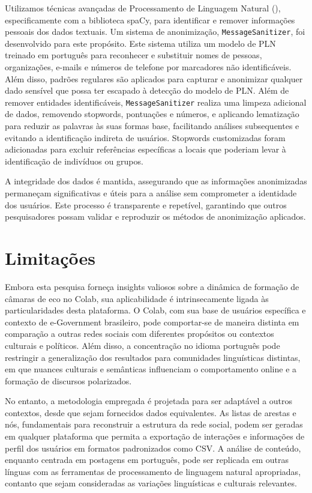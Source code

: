 Utilizamos técnicas avançadas de Processamento de Linguagem Natural (), especificamente com a biblioteca spaCy, para identificar e remover informações pessoais dos dados textuais. Um sistema de anonimização, \texttt{MessageSanitizer}, foi desenvolvido para este propósito. Este sistema utiliza um modelo de PLN treinado em português para reconhecer e substituir nomes de pessoas, organizações, e-mails e números de telefone por marcadores não identificáveis. Além disso, padrões regulares são aplicados para capturar e anonimizar qualquer dado sensível que possa ter escapado à detecção do modelo de PLN. Além de remover entidades identificáveis, \texttt{MessageSanitizer} realiza uma limpeza adicional de dados, removendo stopwords, pontuações e números, e aplicando lematização para reduzir as palavras às suas formas base, facilitando análises subsequentes e evitando a identificação indireta de usuários. Stopwords customizadas foram adicionadas para excluir referências específicas a locais que poderiam levar à identificação de indivíduos ou grupos.

A integridade dos dados é mantida, assegurando que as informações anonimizadas permaneçam significativas e úteis para a análise sem comprometer a identidade dos usuários. Este processo é transparente e repetível, garantindo que outros pesquisadores possam validar e reproduzir os métodos de anonimização aplicados.

\section{Limitações}

Embora esta pesquisa forneça insights valiosos sobre a dinâmica de formação de câmaras de eco no Colab, sua aplicabilidade é intrinsecamente ligada às particularidades desta plataforma. O Colab, com sua base de usuários específica e contexto de e-Government brasileiro, pode comportar-se de maneira distinta em comparação a outras redes sociais com diferentes propósitos ou contextos culturais e políticos. Além disso, a concentração no idioma português pode restringir a generalização dos resultados para comunidades linguísticas distintas, em que nuances culturais e semânticas influenciam o comportamento online e a formação de discursos polarizados.

No entanto, a metodologia empregada é projetada para ser adaptável a outros contextos, desde que sejam fornecidos dados equivalentes. As listas de arestas e nós, fundamentais para reconstruir a estrutura da rede social, podem ser geradas em qualquer plataforma que permita a exportação de interações e informações de perfil dos usuários em formatos padronizados como CSV. A análise de conteúdo, enquanto centrada em postagens em português, pode ser replicada em outras línguas com as ferramentas de processamento de linguagem natural apropriadas, contanto que sejam consideradas as variações linguísticas e culturais relevantes.

